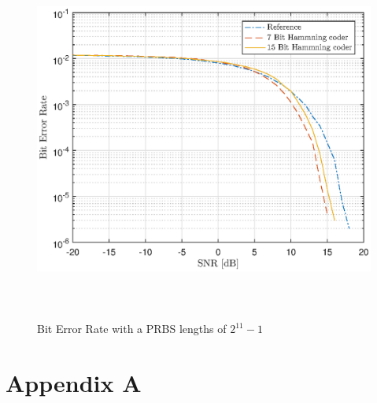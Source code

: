\documentclass[12pt]{article}
\begin{document}
\begin{figure}[H]
    \centering
    \includegraphics[height=12cm]{PlotSeq2.eps}
    \caption{Bit Error Rate with a PRBS lengths of $2^{11}-1 $}
    \label{fig:seq2}
\end{figure}






\clearpage
\section{Appendix A}
\inputminted{matlab}{DataEncoder.m}

\inputminted{matlab}{DataDecoder.m}

\inputminted{matlab}{Decision.m}

\inputminted{matlab}{Noise.m}


\inputminted{matlab}{main.m}
\end{document}
